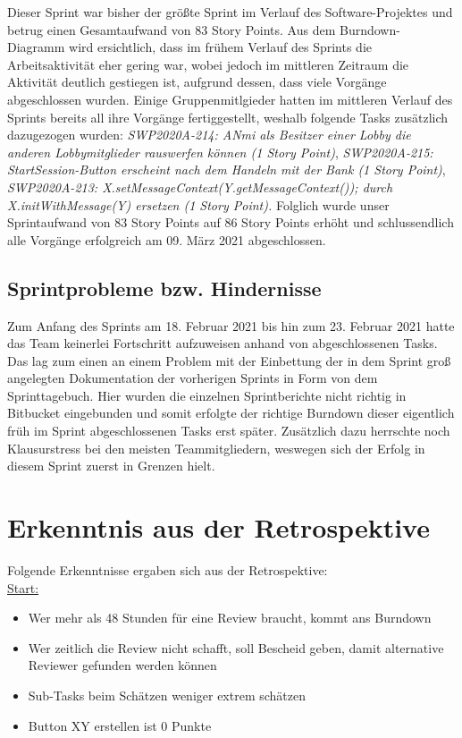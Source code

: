 \documentclass[12pt,a4paper, oneside]{article}
\begin{document}
\noindent
Dieser Sprint war bisher der größte Sprint im Verlauf des Software-Projektes und betrug einen Gesamtaufwand von 83 Story Points. Aus dem Burndown-Diagramm wird ersichtlich, dass im frühem Verlauf des Sprints die Arbeitsaktivität eher gering war, wobei jedoch im mittleren Zeitraum die Aktivität deutlich gestiegen ist, aufgrund dessen, dass viele Vorgänge abgeschlossen wurden. Einige Gruppenmitlgieder hatten im mittleren Verlauf des Sprints bereits all ihre Vorgänge fertiggestellt, weshalb folgende Tasks zusätzlich dazugezogen wurden: \textit{SWP2020A-214: ANmi als Besitzer einer Lobby die anderen Lobbymitglieder rauswerfen können (1 Story Point)}, \textit{SWP2020A-215: StartSession-Button erscheint nach dem Handeln mit der Bank (1 Story Point)}, 
\textit{SWP2020A-213: X.setMessageContext(Y.getMessageContext()); durch X.initWithMessage(Y) ersetzen (1 Story Point).} Folglich wurde unser Sprintaufwand von 83 Story Points auf 86 Story Points erhöht und schlussendlich alle Vorgänge erfolgreich am 09. März 2021 abgeschlossen. 



\subsection{Sprintprobleme bzw. Hindernisse}

Zum Anfang des Sprints am 18. Februar 2021 bis hin zum 23. Februar 2021 hatte das Team keinerlei Fortschritt aufzuweisen anhand von abgeschlossenen Tasks. Das lag zum einen an einem Problem mit der Einbettung der in dem Sprint groß angelegten Dokumentation der vorherigen Sprints in Form von dem Sprinttagebuch. Hier wurden die einzelnen Sprintberichte nicht richtig in Bitbucket eingebunden und somit erfolgte der richtige Burndown dieser eigentlich früh im Sprint abgeschlossenen Tasks erst später. Zusätzlich dazu herrschte noch Klausurstress bei den meisten Teammitgliedern, weswegen sich der Erfolg in diesem Sprint zuerst in Grenzen hielt.


\newpage
\section{Erkenntnis aus der Retrospektive}

Folgende Erkenntnisse ergaben sich aus der Retrospektive:\\

\underline{Start:}
\begin{itemize}
    \item Wer mehr als 48 Stunden für eine Review braucht, kommt ans Burndown
    \item Wer zeitlich die Review nicht schafft, soll Bescheid geben, damit alternative Reviewer gefunden werden können
    \item Sub-Tasks beim Schätzen weniger extrem schätzen
    \item Button XY erstellen ist 0 Punkte
    \\
\end{itemize}
\end{document}
